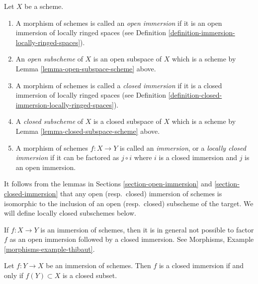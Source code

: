 \begin{definition}
\label{definition-immersion}
Let $X$ be a scheme.
\begin{enumerate}
\item A morphism of schemes is called an {\it open immersion}
if it is an open immersion of locally ringed spaces (see
Definition \ref{definition-immersion-locally-ringed-spaces}).
\item An {\it open subscheme} of $X$ is an open subspace of $X$
which is a scheme by Lemma \ref{lemma-open-subspace-scheme} above.
\item A morphism of schemes is called a {\it closed immersion}
if it is a closed immersion of locally ringed spaces (see
Definition \ref{definition-closed-immersion-locally-ringed-spaces}).
\item A {\it closed subscheme} of $X$ is a closed subspace of $X$
which is a scheme by Lemma \ref{lemma-closed-subspace-scheme} above.
\item A morphism of schemes $f : X \to Y$ is called an {\it immersion},
or a {\it locally closed immersion} if it can be factored as
$j \circ i$ where $i$ is a closed immersion and $j$ is an open
immersion.
\end{enumerate}
\end{definition}

\noindent
It follows from the lemmas in Sections \ref{section-open-immersion}
and \ref{section-closed-immersion} that any open
(resp.\ closed) immersion of schemes
is isomorphic to the inclusion of an open
(resp.\ closed) subscheme of the target.
We will define locally closed subschemes below.

\begin{remark}
\label{remark-not-reverse-open-closed}
If $f : X \to Y$ is an immersion of schemes, then it is in general
not possible to factor $f$ as an open immersion followed
by a closed immersion. See Morphisms, Example \ref{morphisms-example-thibaut}.
\end{remark}

\begin{lemma}
\label{lemma-immersion-when-closed}
Let $f : Y \to X$ be an immersion of schemes. Then $f$ is a closed
immersion if and only if $f(Y) \subset X$ is a closed subset.
\end{lemma}

